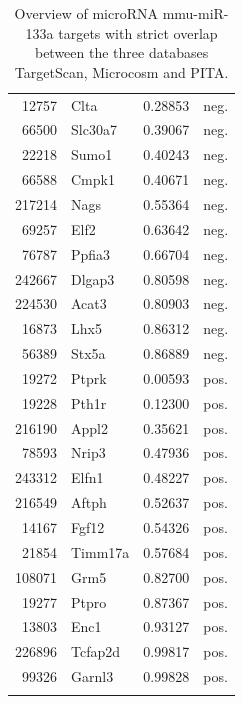 \documentclass{article}
\begin{document}
\begin{Schunk}
\begin{longtable}{rlrl}
  12757 & Clta & 0.28853 & neg. \\ 
  66500 & Slc30a7 & 0.39067 & neg. \\ 
  22218 & Sumo1 & 0.40243 & neg. \\ 
  66588 & Cmpk1 & 0.40671 & neg. \\ 
  217214 & Nags & 0.55364 & neg. \\ 
  69257 & Elf2 & 0.63642 & neg. \\ 
  76787 & Ppfia3 & 0.66704 & neg. \\ 
  242667 & Dlgap3 & 0.80598 & neg. \\ 
  224530 & Acat3 & 0.80903 & neg. \\ 
  16873 & Lhx5 & 0.86312 & neg. \\ 
  56389 & Stx5a & 0.86889 & neg. \\ 
  19272 & Ptprk & 0.00593 & pos. \\ 
  19228 & Pth1r & 0.12300 & pos. \\ 
  216190 & Appl2 & 0.35621 & pos. \\ 
  78593 & Nrip3 & 0.47936 & pos. \\ 
  243312 & Elfn1 & 0.48227 & pos. \\ 
  216549 & Aftph & 0.52637 & pos. \\ 
  14167 & Fgf12 & 0.54326 & pos. \\ 
  21854 & Timm17a & 0.57684 & pos. \\ 
  108071 & Grm5 & 0.82700 & pos. \\ 
  19277 & Ptpro & 0.87367 & pos. \\ 
  13803 & Enc1 & 0.93127 & pos. \\ 
  226896 & Tcfap2d & 0.99817 & pos. \\ 
  99326 & Garnl3 & 0.99828 & pos. \\ 
   \hline
\hline
\caption{Overview of microRNA mmu-miR-133a targets with strict overlap between the three databases TargetScan, Microcosm and PITA.}
\end{longtable}\end{Schunk}
\end{document}

